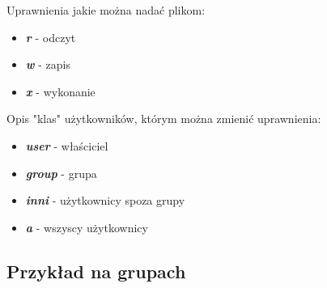 \documentclass{article}
\begin{document}
Uprawnienia jakie można nadać plikom:
\begin{itemize}
    \item \emph{\textbf{r}} - odczyt
    \item \emph{\textbf{w}} - zapis
    \item \emph{\textbf{x}} - wykonanie
\end{itemize}

Opis "klas" użytkowników, którym można zmienić uprawnienia:
\begin{itemize}
    \item  \emph{\textbf{user}} - właściciel
    \item  \emph{\textbf{group}} - grupa
    \item  \emph{\textbf{inni}} - użytkownicy spoza grupy
    \item  \emph{\textbf{a}} - wszyscy użytkownicy
\end{itemize}
\subsection{Przykład na grupach}
\end{document}
